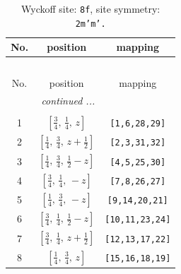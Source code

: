 \documentclass[fleqn,8pt]{jsarticle}
\begin{document}
\begin{longtable}{ccc}
\caption{Wyckoff site: {\tt 8f}, site symmetry: {\tt 2m'm'.}}
 \\
 \hline \hline
No. & position & mapping \\ \hline \endfirsthead

\multicolumn{2}{l}{\tablename\ \thetable{}} \\
 \hline \hline
No. & position & mapping \\ \hline \endhead

 \hline \hline
\multicolumn{2}{r}{\footnotesize\it continued ...} \\ \endfoot

 \hline \hline
\multicolumn{2}{r}{} \\ \endlastfoot

1 & $\left[ \frac{3}{4},\, \frac{1}{4},\, z \right]$ & {\tt [1,6,28,29]} \\ \hline
2 & $\left[ \frac{1}{4},\, \frac{3}{4},\, z + \frac{1}{2} \right]$ & {\tt [2,3,31,32]} \\ \hline
3 & $\left[ \frac{1}{4},\, \frac{3}{4},\, \frac{1}{2} - z \right]$ & {\tt [4,5,25,30]} \\ \hline
4 & $\left[ \frac{3}{4},\, \frac{1}{4},\, - z \right]$ & {\tt [7,8,26,27]} \\ \hline
5 & $\left[ \frac{1}{4},\, \frac{3}{4},\, - z \right]$ & {\tt [9,14,20,21]} \\ \hline
6 & $\left[ \frac{3}{4},\, \frac{1}{4},\, \frac{1}{2} - z \right]$ & {\tt [10,11,23,24]} \\ \hline
7 & $\left[ \frac{3}{4},\, \frac{1}{4},\, z + \frac{1}{2} \right]$ & {\tt [12,13,17,22]} \\ \hline
8 & $\left[ \frac{1}{4},\, \frac{3}{4},\, z \right]$ & {\tt [15,16,18,19]} \\
\end{longtable}
\renewcommand{\arraystretch}{1.2}
\end{document}
